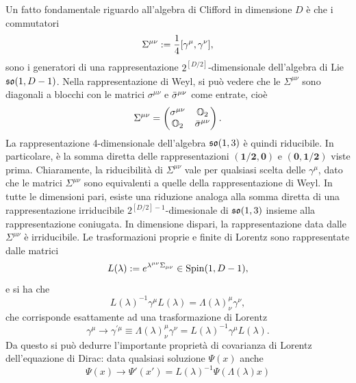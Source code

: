 Un fatto fondamentale riguardo all'algebra di Clifford in dimensione $D$ è che i commutatori 
\begin{equation}
    \Sigma^{\mu\nu} := \frac{1}{4}[\gamma^\mu,\gamma^\nu],
\end{equation}
sono i generatori di una rappresentazione $2^{[D/2]}$-dimensionale dell'algebra di Lie $\mathfrak{so}(1, D - 1)$. Nella rappresentazione di Weyl, si può vedere che le $\Sigma^{\mu\nu}$ sono diagonali a blocchi con le matrici $\sigma^{\mu\nu}$ e $\bar{\sigma}^{\mu\nu}$ come entrate, cioè
\begin{equation}
    \Sigma^{\mu\nu} = 
    \begin{pmatrix}
        \sigma^{\mu\nu} & \mathbb{O}_2 \\
        \mathbb{O}_2 & \bar{\sigma}^{\mu\nu}
    \end{pmatrix}.
\end{equation}
La rappresentazione 4-dimensionale dell'algebra $\mathfrak{so}(1, 3)$ è quindi riducibile. In particolare, è la somma diretta delle rappresentazioni $\bm{(1/2,0)}$ e $\bm{(0,1/2)}$ viste prima. Chiaramente, la riducibilità di $\Sigma^{\mu\nu}$ vale per qualsiasi scelta delle $\gamma^\mu$, dato che le matrici $\Sigma^{\mu\nu}$ sono equivalenti a quelle della rappresentazione di Weyl. In tutte le dimensioni pari, esiste una riduzione analoga alla somma diretta di una rappresentazione irriducibile $2^{[D/2] - 1}$-dimesionale di $\mathfrak{so}(1, 3)$ insieme alla rappresentazione coniugata. In dimensione dispari, la rappresentazione data dalle $\Sigma^{\mu\nu}$ è irriducibile. Le trasformazioni proprie e finite di Lorentz sono rappresentate dalle matrici 
\begin{equation}
\label{eq: matrici trasformazioni di Lorentz finite proprie}
    L(\lambda) := e^{\lambda^{\mu\nu}\Sigma_{\mu\nu}} \in \mathrm{Spin}(1,D - 1),
\end{equation}
e si ha che 
\begin{equation}
    L(\lambda)^{-1}\gamma^\mu L(\lambda) = \Lambda(\lambda)^\mu_\nu \gamma^\nu,
\end{equation}
che corrisponde esattamente ad una trasformazione di Lorentz
\begin{equation}
    \gamma^\mu \to \gamma^{\prime\mu} \equiv \Lambda(\lambda)^\mu_\nu \gamma^\nu = L(\lambda)^{-1}\gamma^\mu L(\lambda).
\end{equation}
Da questo si può dedurre l'importante proprietà di covarianza di Lorentz dell'equazione di Dirac: data qualsiasi soluzione $\Psi(x)$ anche 
\begin{equation}
    \Psi(x) \to \Psi'(x') = L(\lambda)^{-1}\Psi(\Lambda(\lambda) x)
\end{equation}
